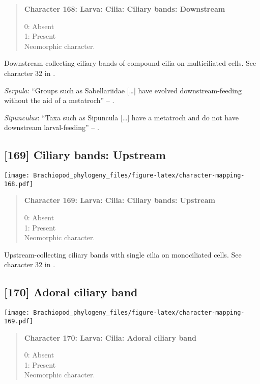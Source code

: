 \documentclass[openany]{book}
\theoremstyle{definition}
\theoremstyle{definition}
\theoremstyle{definition}
\theoremstyle{remark}
\begin{document}
\begin{quote}
\textbf{Character 168: Larva: Cilia: Ciliary bands: Downstream}

0: Absent\\
1: Present\\
Neomorphic character.
\end{quote}

Downstream-collecting ciliary bands of compound cilia on multiciliated
cells. See character 32 in \citet{Glenner2004}.

\hypertarget{Serpula-coding-168}{}
\emph{Serpula}: ``Groups such as Sabellariidae {[}\ldots{}{]} have
evolved downstream-feeding without the aid of a metatroch'' --
\citep{Rouse2000}.

\hypertarget{Sipunculus-coding-168}{}
\emph{Sipunculus}: ``Taxa such as Sipuncula {[}\ldots{}{]} have a
metatroch and do not have downstream larval-feeding'' --
\citet{Rouse2000}.

\subsection*{{[}169{]} Ciliary bands:
Upstream}\label{ciliary-bands-upstream}

\texttt{[image: Brachiopod\_phylogeny\_files/figure-latex/character-mapping-168.pdf]}

\begin{quote}
\textbf{Character 169: Larva: Cilia: Ciliary bands: Upstream}

0: Absent\\
1: Present\\
Neomorphic character.
\end{quote}

Upstream-collecting ciliary bands with single cilia on monociliated
cells. See character 32 in \citet{Glenner2004}.

\subsection*{{[}170{]} Adoral ciliary band}\label{adoral-ciliary-band}

\texttt{[image: Brachiopod\_phylogeny\_files/figure-latex/character-mapping-169.pdf]}

\begin{quote}
\textbf{Character 170: Larva: Cilia: Adoral ciliary band}

0: Absent\\
1: Present\\
Neomorphic character.
\end{quote}
\end{document}

